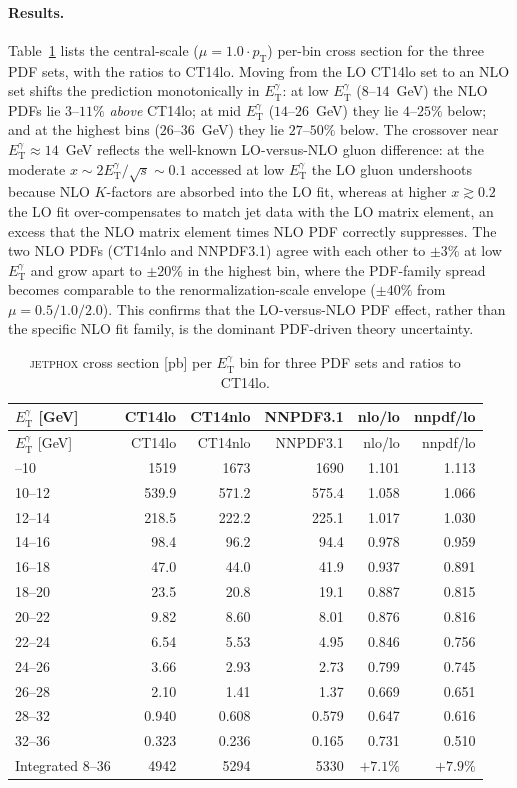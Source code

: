 \documentclass[11pt]{article}
\newcommand{\ETg}{E_{\mathrm{T}}^{\gamma}}
\newcommand{\sqrts}{\sqrt{s}}
\begin{document}
\paragraph{Results.} Table~\ref{tab:jetphox} lists the central-scale
($\mu=1.0\cdot p_{\mathrm{T}}$) per-bin cross section for the three PDF sets,
with the ratios to CT14lo. Moving from the LO CT14lo set to an NLO set shifts the
prediction monotonically in $\ETg$: at low $\ETg$ ($8$--$14$~GeV) the NLO PDFs lie
$3$--$11\%$ \emph{above} CT14lo; at mid $\ETg$ ($14$--$26$~GeV) they lie
$4$--$25\%$ below; and at the highest bins ($26$--$36$~GeV) they lie $27$--$50\%$
below. The crossover near $\ETg\approx14$~GeV reflects the well-known
LO-versus-NLO gluon difference: at the moderate $x\sim2\ETg/\sqrts\sim0.1$
accessed at low $\ETg$ the LO gluon undershoots because NLO $K$-factors are
absorbed into the LO fit, whereas at higher $x\gtrsim0.2$ the LO fit
over-compensates to match jet data with the LO matrix element, an excess that the
NLO matrix element times NLO PDF correctly suppresses. The two NLO PDFs
(CT14nlo and NNPDF3.1) agree with each other to $\pm3\%$ at low $\ETg$ and grow
apart to $\pm20\%$ in the highest bin, where the PDF-family spread becomes
comparable to the renormalization-scale envelope ($\pm40\%$ from
$\mu=0.5/1.0/2.0$). This confirms that the LO-versus-NLO PDF effect, rather than
the specific NLO fit family, is the dominant PDF-driven theory uncertainty.

\begin{longtable}{lrrrrr}
\caption{\textsc{jetphox} cross section [pb] per $\ETg$ bin for three PDF sets
and ratios to CT14lo.}\label{tab:jetphox}\\
\toprule
$\ETg$ [GeV] & CT14lo & CT14nlo & NNPDF3.1 & nlo/lo & nnpdf/lo \\
\midrule
\endfirsthead
\toprule
$\ETg$ [GeV] & CT14lo & CT14nlo & NNPDF3.1 & nlo/lo & nnpdf/lo \\
\midrule
\endhead
\bottomrule
\endfoot
8--10   & 1519  & 1673  & 1690  & 1.101 & 1.113 \\
10--12  & 539.9 & 571.2 & 575.4 & 1.058 & 1.066 \\
12--14  & 218.5 & 222.2 & 225.1 & 1.017 & 1.030 \\
14--16  & 98.4  & 96.2  & 94.4  & 0.978 & 0.959 \\
16--18  & 47.0  & 44.0  & 41.9  & 0.937 & 0.891 \\
18--20  & 23.5  & 20.8  & 19.1  & 0.887 & 0.815 \\
20--22  & 9.82  & 8.60  & 8.01  & 0.876 & 0.816 \\
22--24  & 6.54  & 5.53  & 4.95  & 0.846 & 0.756 \\
24--26  & 3.66  & 2.93  & 2.73  & 0.799 & 0.745 \\
26--28  & 2.10  & 1.41  & 1.37  & 0.669 & 0.651 \\
28--32  & 0.940 & 0.608 & 0.579 & 0.647 & 0.616 \\
32--36  & 0.323 & 0.236 & 0.165 & 0.731 & 0.510 \\
\midrule
Integrated 8--36 & 4942 & 5294 & 5330 & $+7.1\%$ & $+7.9\%$ \\
\end{longtable}
\end{document}
